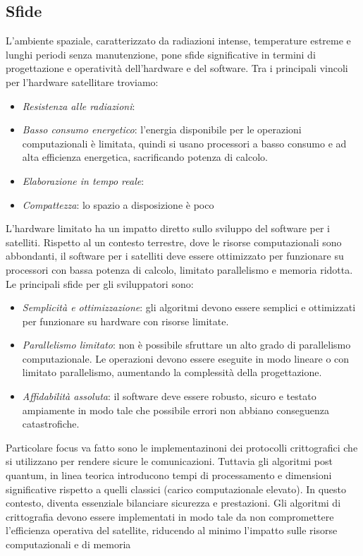 \subsection{Sfide}

L'ambiente spaziale, caratterizzato da radiazioni intense, temperature estreme e lunghi periodi senza manutenzione, pone sfide significative in termini di progettazione e operatività dell'hardware e del software.
Tra i principali vincoli per l'hardware satellitare troviamo:

\begin{itemize}
    \item \textit{Resistenza alle radiazioni}:
    \item \textit{Basso consumo energetico}: l'energia disponibile per le operazioni computazionali è limitata, quindi si usano processori a basso consumo e ad alta efficienza energetica, sacrificando potenza di calcolo.
    \item \textit{Elaborazione in tempo reale}:
    \item \textit{Compattezza}: lo spazio a disposizione è poco 
\end{itemize}

L'hardware limitato ha un impatto diretto sullo sviluppo del software per i satelliti. 
Rispetto al un contesto terrestre, dove le risorse computazionali sono abbondanti, il software per i satelliti deve essere ottimizzato per funzionare su processori con bassa potenza di calcolo, limitato parallelismo e memoria ridotta. 
Le principali sfide per gli sviluppatori sono:

\begin{itemize}
    \item \textit{Semplicità e ottimizzazione}: gli algoritmi devono essere semplici e ottimizzati per funzionare su hardware con risorse limitate.
    \item \textit{Parallelismo limitato}: non è possibile sfruttare un alto grado di parallelismo computazionale. Le operazioni devono essere eseguite in modo lineare o con limitato parallelismo, aumentando la complessità della progettazione.
    \item \textit{Affidabilità assoluta}: il software deve essere robusto, sicuro e testato ampiamente in modo tale che possibile errori non abbiano conseguenza catastrofiche.
\end{itemize}

Particolare focus va fatto sono le implementazinoni dei protocolli crittografici che si utilizzano per rendere sicure le comunicazioni.
Tuttavia gli algoritmi post quantum, in linea teorica introducono tempi di processamento e dimensioni significative rispetto a quelli classici (carico computazionale elevato).
In questo contesto, diventa essenziale bilanciare sicurezza e prestazioni. Gli algoritmi di crittografia devono essere implementati in modo tale da non compromettere l'efficienza operativa del satellite, riducendo al minimo l'impatto sulle risorse computazionali e di memoria

